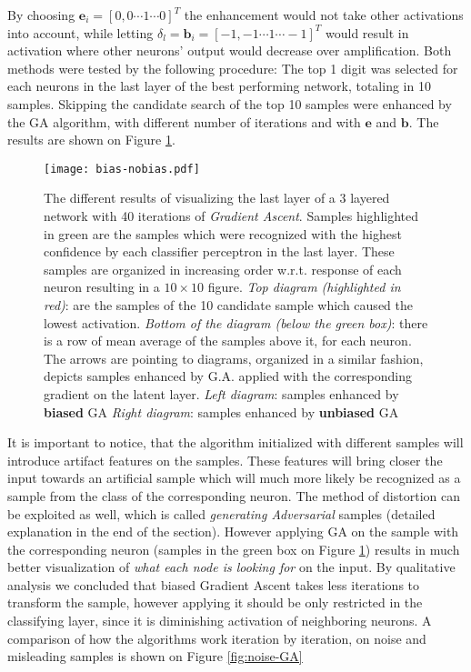 By choosing $\mathbf{e}_{i} = [0, 0 \cdots 1 \cdots 0]^T$ the enhancement would not take other activations into account, while letting $\delta_l = \mathbf{b}_i = [-1, -1 \cdots 1 \cdots -1]^T$ would result in activation where other neurons' output would decrease over amplification. 
Both methods were tested by the following procedure: The top 1 digit was selected for each neurons in the last layer of the best performing network, totaling in 10 samples. Skipping the candidate search of the top 10 samples were enhanced by the GA algorithm, with different number of iterations and with $\mathbf{e}$ and $ \mathbf{b}$. The results are shown on Figure \ref{fig:bias-nobias}. 

\begin{figure}
    \centering
    \texttt{[image: bias-nobias.pdf]}
    \caption{
        The different results of visualizing the last layer of a 3 layered network with 40 iterations of \emph{Gradient Ascent}. 
        Samples highlighted in green are the samples which were recognized with the highest confidence by each classifier perceptron in the last layer.
        These samples are organized in increasing order w.r.t. response of each neuron resulting in a $10 \times 10$ figure.
        \emph{Top diagram (highlighted in red)}: are the samples of the 10 candidate sample which caused the lowest activation.
        \emph{Bottom of the diagram (below the green box)}: there is a row of mean average of the samples above it, for each neuron.
        The arrows are pointing to diagrams, organized in a similar fashion, depicts samples enhanced by 
            G.A. applied with the corresponding gradient on the latent layer. 
        \emph{Left diagram}: samples enhanced by \textbf{biased} GA
        \emph{Right diagram}: samples enhanced by \textbf{unbiased} GA
    }
    \label{fig:bias-nobias}
\end{figure}
It is important to notice, that the algorithm initialized with different samples will introduce artifact features on the samples. 
These features will bring closer the input towards an artificial sample which will much more likely be recognized as a sample from the class of the corresponding neuron. 
The method of distortion can be exploited as well, which is called \emph{generating Adversarial} samples (detailed explanation in the end of the section).
However applying GA on the sample with the corresponding neuron (samples in the green box on Figure \ref{fig:bias-nobias}) results in much better visualization of \emph{what each node is looking for} on the input.
By qualitative analysis we concluded that biased Gradient Ascent takes less iterations to transform the sample, however applying it should be  only restricted in the classifying layer, since it is diminishing activation of neighboring neurons. 
A comparison of how the algorithms work iteration by iteration, on noise and misleading samples is shown on Figure \ref{fig:noise-GA}
    

